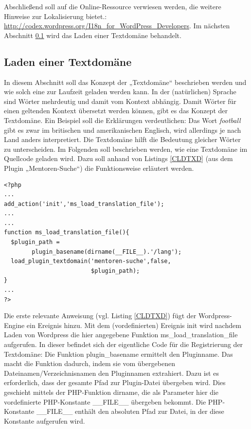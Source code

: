 Abschließend soll auf die Online-Ressource verwiesen werden, die weitere Hinweise zur  Lokalisierung bietet.: \url{http://codex.wordpress.org/I18n\_for\_WordPress\_Developers}.
Im nächsten Abschnitt \ref{sub:letd} wird das Laden einer Textdomäne behandelt. 
\subsection{Laden einer Textdomäne}\label{sub:letd}
In diesem Abschnitt soll das Konzept der „Textdomäne“ beschrieben werden und wie solch eine zur Laufzeit geladen werden kann.
In der (natürlichen) Sprache sind Wörter mehrdeutig und damit vom Kontext abhängig.
Damit Wörter für einen geltenden Kontext übersetzt werden können, gibt es das Konzept der Textdomäne. Ein Beispiel soll die Erklärungen verdeutlichen: Das Wort \emph{football} gibt es zwar im britischen und amerikanischen Englisch, wird allerdings je nach Land anders interpretiert. Die Textdomäne hilft die Bedeutung gleicher Wörter zu unterscheiden.\newline
Im Folgenden soll beschrieben werden, wie eine Textdomäne im Quellcode geladen wird. Dazu soll anhand von Listings \ref{CLDTXD} (aus dem Plugin „Mentoren-Suche“) die Funktionsweise erläutert werden.
\begin{lstlisting}
<?php 
...
add_action('init','ms_load_translation_file'); 
...
...
function ms_load_translation_file(){
  $plugin_path =   
        plugin_basename(dirname(__FILE__).'/lang');
  load_plugin_textdomain('mentoren-suche',false, 
                         $plugin_path); 
}
...
?> 
\end{lstlisting}	
Die erste relevante Anweisung (vgl. Listing \ref{CLDTXD}) fügt der Wordpress-Engine ein Ereignis hinzu.
Mit dem (vordefinierten) Ereignis init wird nachdem Laden von Wordpress die hier angegebene Funktion ms\_load\_translation\_file aufgerufen. In dieser befindet sich der eigentliche Code für die Registrierung der Textdomäne:
Die Funktion plugin\_basename ermittelt den Pluginname. Das macht die Funktion dadurch, indem sie vom übergebenen Dateinamen/Verzeichnisnamen den Pluginnamen extrahiert.\newline
Dazu ist es erforderlich, dass der gesamte Pfad zur Plugin-Datei übergeben wird. Dies geschieht mittels der PHP-Funktion dirname, die als Parameter hier die vordefinierte PHP-Konstante \_\_FILE\_\_ übergeben bekommt. Die PHP-Konstante \_\_FILE\_\_ enthält den absoluten Pfad zur Datei, in der diese Konstante aufgerufen wird.\newline

